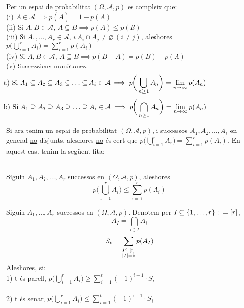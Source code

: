 \begin{prop}
  Per un espai de probabilitat $(\Omega, \mathcal{A}, p)$ es compleix que: \\
  (i) $A\in\mathcal{A} \implies p(\overline{A}) = 1-p(A)$ \\
  (ii) Si $A, B \in \mathcal{A},\, A \subseteq B \implies p(A)\leq p(B)$ \\
  (iii) Si $A_{1},\ldots,A_{r} \in \mathcal{A}, \, i \, A_{i}\cap A_{j} \not= \varnothing \, (i\not= j)$, aleshores $p\bigg(\bigcup\limits_{i=1}^{r}A_{i} \bigg) = \sum\limits_{i=1}^{r}p(A_{i})$ \\
  (iv) Si $A,B \in \mathcal{A}, \, A\subseteq B \implies p(B-A) = p(B)-p(A)$\\
  (v) Successions monòtones: 
  \[
    \hspace{-2.5cm}\text{a) Si } A_{1} \subseteq A_{2} \subseteq A_{3} \subseteq \ldots \subseteq A_{i} \in \mathcal{A} \implies p\bigg(\bigcup\limits_{n\geq1}A_{n}\bigg) = \lim_{n\to\infty}p(A_{n})
  \]
  \[
    \hspace{-2.5cm}\text{b) Si } A_{1} \supseteq A_{2} \supseteq A_{3} \supseteq \ldots \supseteq A_{i} \in \mathcal{A} \implies p\bigg(\bigcap\limits_{n\geq1}A_{n}\bigg) = \lim_{n\to\infty}p(A_{n})
  \]
\end{prop}

\newpage

Si ara tenim un espai de probabilitat $(\Omega, \mathcal{A},p)$, i successos $A_{1}, A_{2}, \ldots, A_{i}$ en general \underline{no} disjunts, aleshores \underline{no} és cert que  $p\bigg(\bigcup\limits_{i=1}^{r}A_{r} \bigg) = \sum\limits_{i=1}^{r}p(A_{i})$. En aquest cas, tenim la següent fita:
\begin{lema} \-\\
  Siguin $A_{1}, A_{2}, \ldots, A_{r}$ successos en $(\Omega, \mathcal{A},p)$, aleshores $$p\bigg(\bigcup\limits_{i=1}^{r}A_{i} \bigg) \leq \sum\limits_{i=1}^{r}p(A_{i})$$
\end{lema}

\begin{thm}
  Siguin $A_{1}, \ldots, A_{r}$ successos en $(\Omega, \mathcal{A}, p)$. 
  Denotem per $I\subseteq \left\{1,\ldots,r\right\} \colon = [r]$, \\
  \[
    A_{I} = \bigcap\limits_{i\in I}A_{i}
  \]
  \[
    S_{k} = \sum_{\substack{I\subseteq[r] \\ \left\vert I \right\vert=k}}p(A_{I})
  \]
  Aleshores, si: \\
  1) t és parell, $p\bigg(\bigcup\limits_{i=1}^{r} A_{i}\bigg)\geq \sum\limits_{i=1}^{t}(-1)^{i+1}\cdot S_{i}$\\\\
  2) t és senar, $p\bigg(\bigcup\limits_{i=1}^{r} A_{i}\bigg)\leq \sum\limits_{i=1}^{t}(-1)^{i+1}\cdot S_{i}$
\end{thm}


